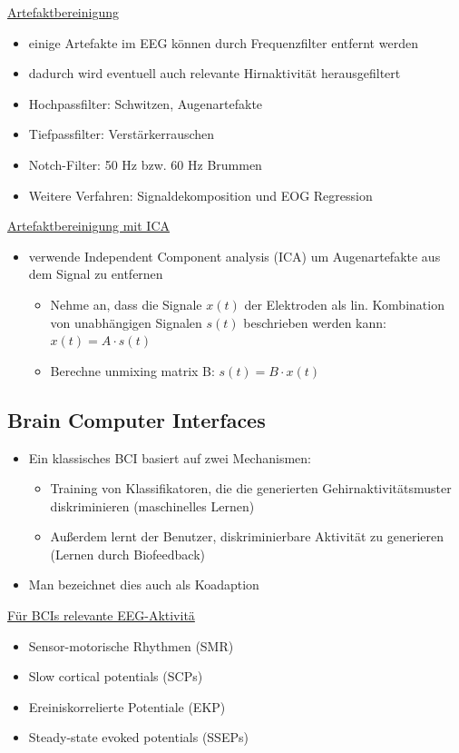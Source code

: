 \documentclass[a4paper,10pt,oneside]{article}
\begin{document}
\underline{Artefaktbereinigung} \\ 	
	\begin{itemize}
		\item einige Artefakte im EEG können durch Frequenzfilter entfernt werden
		\item dadurch wird eventuell auch relevante Hirnaktivität herausgefiltert
		\item Hochpassfilter: Schwitzen, Augenartefakte
		\item Tiefpassfilter: Verstärkerrauschen
		\item Notch-Filter: 50 Hz bzw. 60 Hz Brummen
		\item Weitere Verfahren: Signaldekomposition und EOG Regression
	\end{itemize}
 
\underline{Artefaktbereinigung mit ICA} \\ 
	\begin{itemize}
		\item verwende Independent Component analysis (ICA) um Augenartefakte aus dem Signal zu entfernen
			\begin{itemize}
				\item Nehme an, dass die Signale $x(t)$ der Elektroden als lin. Kombination von unabhängigen Signalen $s(t)$ beschrieben werden kann: $x(t) = A \cdot s(t)$
				\item Berechne unmixing matrix B: $s(t) = B \cdot x(t)$
			\end{itemize}
	\end{itemize}
	
\subsection{Brain Computer Interfaces}
\begin{itemize}
	\item Ein klassisches BCI basiert auf zwei Mechanismen:
		\begin{itemize}
			\item Training von Klassifikatoren, die die generierten Gehirnaktivitätsmuster diskriminieren (maschinelles Lernen)
			\item Außerdem lernt der Benutzer, diskriminierbare Aktivität zu generieren (Lernen durch Biofeedback)
		\end{itemize}
	\item Man bezeichnet dies auch als Koadaption
\end{itemize}

\underline{Für BCIs relevante EEG-Aktivitä} \\ 
	\begin{itemize}
		\item Sensor-motorische Rhythmen (SMR)
		\item Slow cortical potentials (SCPs)
		\item Ereiniskorrelierte Potentiale (EKP) 
		\item Steady-state evoked potentials (SSEPs)
	\end{itemize}
\end{document}
